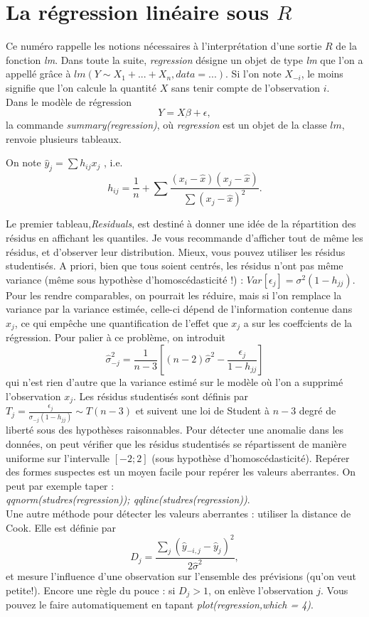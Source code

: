 \section*{La régression linéaire sous $R$}

Ce numéro rappelle les notions nécessaires à l'interprétation d'une sortie $R$ de la fonction \textit{lm}. Dans toute la suite, \textit{regression} désigne un objet de type \textit{lm} que l'on a appellé grâce à $lm(Y\sim X_1+...+X_n, data=...)$. Si l'on note $X_{-i}$, le moins signifie que l'on calcule la quantité $X$ sans tenir compte de l'observation $i$.\\

Dans le modèle de régression \[Y=X\beta + \epsilon ,\]
la commande \textit{summary(regression)}, où \textit{regression} est un objet de la classe $lm$, renvoie plusieurs tableaux. 

On note $\hat y_j =  \sum h_{ij}x_j$ , i.e. \[h_{ij}= \frac{1}{n}+\sum \frac{(x_i-\hat x)(x_j-\hat x)}{\sum (x_j-\hat x)^2}.\]

Le premier tableau,\textit{Residuals}, est destiné à donner une idée de la répartition des résidus en affichant les quantiles.  Je vous recommande d'afficher tout de même les résidus, et d'observer leur distribution. Mieux, vous pouvez utiliser les résidus studentisés. A priori, bien que tous soient centrés, les résidus n'ont pas même variance (même sous hypothèse d'homoscédasticité !) : $Var[\epsilon_j]=\sigma^2(1-h_{jj})$. Pour les rendre comparables, on pourrait les réduire, mais si l'on remplace la variance par la variance estimée, celle-ci dépend de l'information contenue dans $x_j$, ce qui empêche une quantification de l'effet que $x_j$ a sur les coeffcients de la régression. Pour palier à ce problème, on introduit 
\[\hat \sigma_{-j}^2 = \frac{1}{n-3}[(n-2)\hat \sigma^2-\frac{\epsilon_j}{1-h_{jj}}]\]
qui n'est rien d'autre que la variance estimé sur le modèle où l'on a supprimé l'observation $x_j$. Les résidus studentisés sont définis par $T_j = \frac{\epsilon_j}{\sigma_{-j}(1-h_{jj})}\sim T(n-3)$ et suivent une loi de Student à $n-3$ degré de liberté sous des hypothèses raisonnables. Pour détecter une anomalie dans les données, on peut vérifier que les résidus studentisés se répartissent de manière uniforme sur l'intervalle $[-2;2]$ (sous hypothèse d'homoscédasticité). Repérer des formes suspectes est un moyen facile pour repérer les valeurs aberrantes. On peut par exemple taper : \\
\textit{qqnorm(studres(regression)); qqline(studres(regression))}.\\
Une autre méthode pour détecter les valeurs aberrantes : utiliser la distance de Cook. Elle est définie par 
\[D_j= \frac{\sum_j (\hat y_{-i,j}-\hat y_j)^2}{2\hat \sigma^2},\]
et mesure l'influence d'une observation sur l'ensemble des prévisions (qu'on veut petite!). Encore une règle du pouce : si $D_j>1$, on enlève l'observation $j$. Vous pouvez le faire automatiquement en tapant \textit{plot(regression,which = 4)}.

